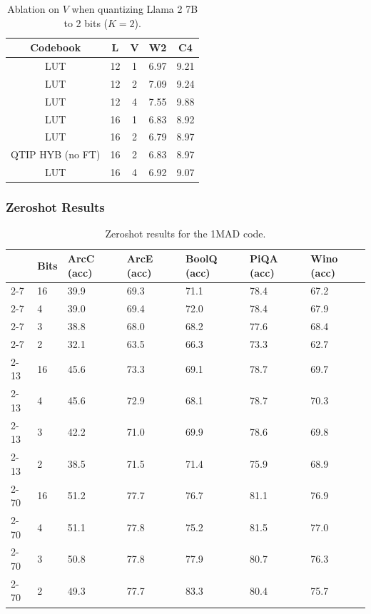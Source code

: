 \begin{table}[h]
\centering
\caption{Ablation on $V$ when quantizing Llama 2 7B to 2 bits ($K=2$).}
\label{tab:vablate}
\begin{tabular}{@{}ccccc@{}}
\toprule
Codebook         & L  & V & W2   & C4   \\ \midrule
LUT              & 12 & 1 & 6.97 & 9.21 \\
LUT              & 12 & 2 & 7.09 & 9.24 \\
LUT              & 12 & 4 & 7.55 & 9.88 \\
LUT              & 16 & 1 & 6.83 & 8.92 \\
LUT              & 16 & 2 & 6.79 & 8.97 \\
QTIP HYB (no FT) & 16 & 2 & 6.83 & 8.97 \\
LUT              & 16 & 4 & 6.92 & 9.07 \\ \bottomrule
\end{tabular}
\end{table}


\subsubsection{Zeroshot Results}

\begin{table}[h]
\centering
\caption{Zeroshot results for the 1MAD code.}
\begin{tabular}{@{}lllllll@{}}
\toprule
     & Bits & ArcC (acc) & ArcE (acc) & BoolQ (acc) & PiQA (acc) & Wino (acc) \\ \midrule
2-7  & 16   & 39.9       & 69.3       & 71.1        & 78.4       & 67.2       \\
2-7  & 4    & 39.0       & 69.4       & 72.0        & 78.4       & 67.9       \\
2-7  & 3    & 38.8       & 68.0       & 68.2        & 77.6       & 68.4       \\
2-7  & 2    & 32.1       & 63.5       & 66.3        & 73.3       & 62.7       \\
2-13 & 16   & 45.6       & 73.3       & 69.1        & 78.7       & 69.7       \\
2-13 & 4    & 45.6       & 72.9       & 68.1        & 78.7       & 70.3       \\
2-13 & 3    & 42.2       & 71.0       & 69.9        & 78.6       & 69.8       \\
2-13 & 2    & 38.5       & 71.5       & 71.4        & 75.9       & 68.9       \\
2-70 & 16   & 51.2       & 77.7       & 76.7        & 81.1       & 76.9       \\
2-70 & 4    & 51.1       & 77.8       & 75.2        & 81.5       & 77.0       \\
2-70 & 3    & 50.8       & 77.8       & 77.9        & 80.7       & 76.3       \\
2-70 & 2    & 49.3       & 77.7       & 83.3        & 80.4       & 75.7       \\ \bottomrule
\end{tabular}
\end{table}

